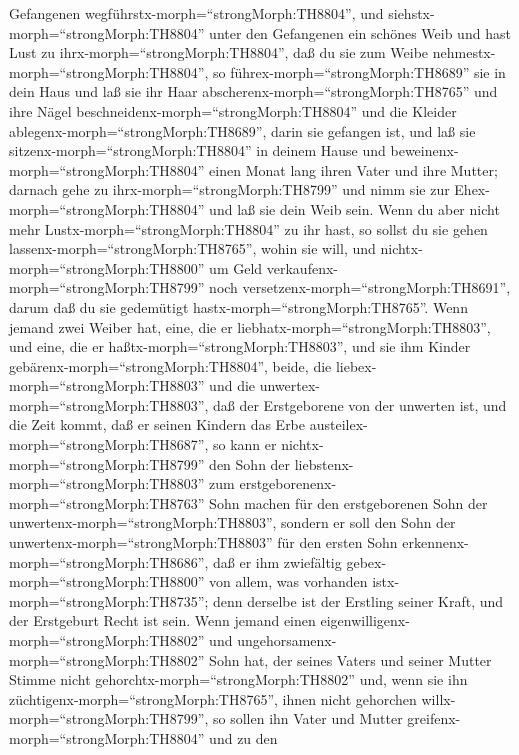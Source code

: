 Gefangenen wegführstx-morph=``strongMorph:TH8804'',  und
siehstx-morph=``strongMorph:TH8804'' unter den Gefangenen ein schönes
Weib und hast Lust zu ihrx-morph=``strongMorph:TH8804'', daß du sie zum
Weibe nehmestx-morph=``strongMorph:TH8804'',  so
führex-morph=``strongMorph:TH8689'' sie in dein Haus und laß sie ihr
Haar abscherenx-morph=``strongMorph:TH8765'' und ihre Nägel
beschneidenx-morph=``strongMorph:TH8804''  und die Kleider
ablegenx-morph=``strongMorph:TH8689'', darin sie gefangen ist, und laß
sie sitzenx-morph=``strongMorph:TH8804'' in deinem Hause und
beweinenx-morph=``strongMorph:TH8804'' einen Monat lang ihren Vater und
ihre Mutter; darnach gehe zu ihrx-morph=``strongMorph:TH8799'' und nimm
sie zur Ehex-morph=``strongMorph:TH8804'' und laß sie dein Weib sein.
 Wenn du aber nicht mehr Lustx-morph=``strongMorph:TH8804''
zu ihr hast, so sollst du sie gehen
lassenx-morph=``strongMorph:TH8765'', wohin sie will, und
nichtx-morph=``strongMorph:TH8800'' um Geld
verkaufenx-morph=``strongMorph:TH8799'' noch
versetzenx-morph=``strongMorph:TH8691'', darum daß du sie gedemütigt
hastx-morph=``strongMorph:TH8765''.  Wenn jemand zwei
Weiber hat, eine, die er liebhatx-morph=``strongMorph:TH8803'', und
eine, die er haßtx-morph=``strongMorph:TH8803'', und sie ihm Kinder
gebärenx-morph=``strongMorph:TH8804'', beide, die
liebex-morph=``strongMorph:TH8803'' und die
unwertex-morph=``strongMorph:TH8803'', daß der Erstgeborene von der
unwerten ist,  und die Zeit kommt, daß er seinen Kindern
das Erbe austeilex-morph=``strongMorph:TH8687'', so kann er
nichtx-morph=``strongMorph:TH8799'' den Sohn der
liebstenx-morph=``strongMorph:TH8803'' zum
erstgeborenenx-morph=``strongMorph:TH8763'' Sohn machen für den
erstgeborenen Sohn der unwertenx-morph=``strongMorph:TH8803'',
 sondern er soll den Sohn der
unwertenx-morph=``strongMorph:TH8803'' für den ersten Sohn
erkennenx-morph=``strongMorph:TH8686'', daß er ihm zwiefältig
gebex-morph=``strongMorph:TH8800'' von allem, was vorhanden
istx-morph=``strongMorph:TH8735''; denn derselbe ist der Erstling seiner
Kraft, und der Erstgeburt Recht ist sein.  Wenn jemand
einen eigenwilligenx-morph=``strongMorph:TH8802'' und
ungehorsamenx-morph=``strongMorph:TH8802'' Sohn hat, der seines Vaters
und seiner Mutter Stimme nicht gehorchtx-morph=``strongMorph:TH8802''
und, wenn sie ihn züchtigenx-morph=``strongMorph:TH8765'', ihnen nicht
gehorchen willx-morph=``strongMorph:TH8799'',  so sollen
ihn Vater und Mutter greifenx-morph=``strongMorph:TH8804'' und zu den
